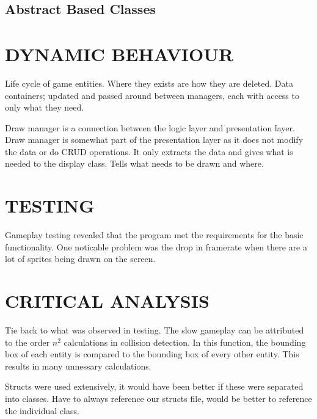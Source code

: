 \documentclass[10pt,twocolumn]{witseiepaper}
\begin{document}
\subsection{Abstract Based Classes}




%
\section{DYNAMIC BEHAVIOUR} %
Life cycle of game entities. Where they exists are how they are deleted. Data containers; updated and passed around between managers, each with access to only what they need. 

Draw manager is a connection between the logic layer and presentation layer. Draw manager is somewhat part of the presentation layer as it does not modify the data or do CRUD operations. It only extracts the data and gives what is needed to the display class. Tells what needs to be drawn and where.



%
\section{TESTING} %
Gameplay testing revealed that the program met the requirements for the basic functionality. One noticable problem was the drop in framerate when there are a lot of sprites being drawn on the screen.

%
\section{CRITICAL ANALYSIS} %
Tie back to what was observed in testing. The slow gameplay can be attributed to the order $ n^{2} $ calculations in collision detection. In this function, the bounding box of each entity is compared to the bounding box of every other entity. This results in many unnessary calculations.

Structs were used extensively, it would have been better if these were separated into classes. Have to always reference our structs file, would be better to reference the individual class. 
\end{document}
